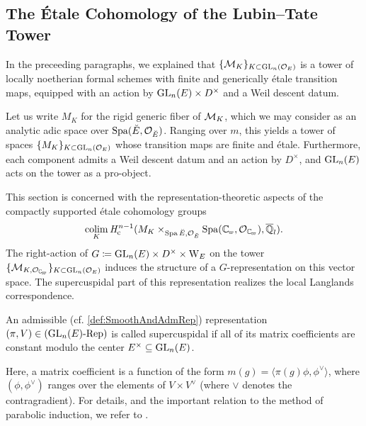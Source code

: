 \documentclass[../main.tex]{subfiles}
\begin{document}

\subsection{The \'Etale Cohomology of the Lubin--Tate Tower} %
\label{sub:The Local Langlands Correspondence for the General Linear Group}
In the preceeding paragraphs, we explained that $\{\mathcal{M}_{K}\}_{K \subset
\operatorname{GL}_n(\mathcal{O}_E)}$ is a 
tower of locally noetherian formal schemes with finite and generically \'etale 
transition maps, equipped with an action by $\operatorname{GL}_n(E) \times D^\times$ and 
a Weil descent datum. 

Let us write $M_{K}$ for the rigid generic fiber of $\mathcal{M}_{K}$,
which we may consider as an analytic adic space over $\operatorname{Spa}({\breve {E}},\mathcal{O}_{\breve {E}})$. 
Ranging over $m$, this yields a tower of spaces $\{M_{K}\}_{K \subset
\operatorname{GL}_n(\mathcal{O}_E)}$ whose transition maps are finite and \'etale. Furthermore, each
component admits a Weil descent datum and an action by $D^\times$, and $\operatorname{GL}_n(E)$
acts on the tower as a pro-object. 

This section is concerned with the representation-theoretic aspects of
the compactly supported \'etale cohomology groups
\begin{equation*}
  \colim_K \hHc^{n-1} (M_{K} \times_{\spa{\br E,\cO_\br E}} \Spa(\Cp, \cO_\Cp),
  \bar \Q_l).
\end{equation*}
The right-action of $G \coloneqq \operatorname{GL}_n(E) \times D^\times \times \mathrm W_E$ on the tower
$\{\cM_{K, \cO_\Cp}\}_{K \subset \GL_n(\cO_E)}$ induces the structure of a
$G$-representation on this vector space. 
The supercuspidal part of this representation realizes the local Langlands
correspondence. 

\begin{defi}\label{def:SuperCusp}
  An admissible (cf. \cref{def:SmoothAndAdmRep}) representation $(\pi,V) \in
  {({\operatorname{GL}_n(E)}\textnormal-\allowbreak\mathrm{Rep})}$ is called supercuspidal if all of its matrix coefficients are
  constant modulo the center $E^\times \subseteq \operatorname{GL}_n(E)$.
\end{defi}

Here, a matrix coefficient is a function of the form $m(g) = \langle \pi(g)
\phi, \phi^\vee\rangle$, where $(\phi, \phi^\vee)$ ranges over the elements of
$V \times V^\vee$ (where $\vee$ denotes the contragradient). For details, and
the important relation to the method of parabolic induction, we refer to
\cite[Section 8]{getz2023introduction}.
\end{document}
